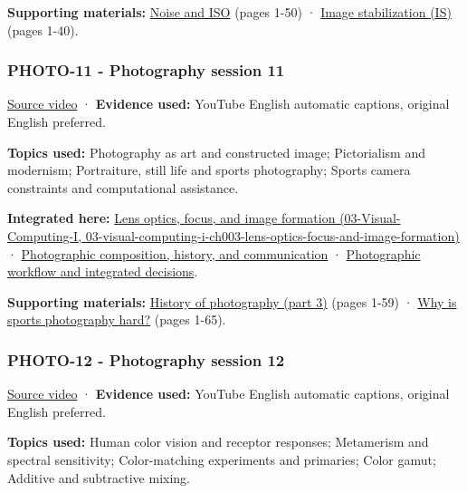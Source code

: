 \textbf{Supporting materials:} \href{https://drive.google.com/open?id=0B6w2XfPHEcZYS2xETmR4SVlIczg}{Noise and ISO} (pages 1-50) · \href{https://drive.google.com/open?id=0B6w2XfPHEcZYcFpESFU4dEM3QkE}{Image stabilization (IS)} (pages 1-40).

\subsubsection{PHOTO-11 - Photography session 11}\label{04-visual-computing-ii-ch036-photo-11---photography-session-11}

\href{https://www.youtube.com/watch?v=AaJz5RMtO4c}{Source video} · \textbf{Evidence used:} YouTube English automatic captions, original English preferred.

\textbf{Topics used:} Photography as art and constructed image; Pictorialism and modernism; Portraiture, still life and sports photography; Sports camera constraints and computational assistance.

\textbf{Integrated here:} \href{../03-Visual-Computing-I/main.pdf\#nameddest=03-visual-computing-i-ch003-lens-optics-focus-and-image-formation}{Lens optics, focus, and image formation (03-Visual-Computing-I, 03-visual-computing-i-ch003-lens-optics-focus-and-image-formation)} · \hyperref[04-visual-computing-ii-ch034-photographic-composition-history-and-communication]{Photographic composition, history, and communication} · \hyperref[04-visual-computing-ii-ch034-photographic-workflow-and-integrated-decisions]{Photographic workflow and integrated decisions}.

\textbf{Supporting materials:} \href{https://drive.google.com/open?id=0B6w2XfPHEcZYU1hzN1BtalBqQ1U}{History of photography (part 3)} (pages 1-59) · \href{https://drive.google.com/open?id=0B6w2XfPHEcZYc1BpLTNjZGUzbk0}{Why is sports photography hard?} (pages 1-65).

\subsubsection{PHOTO-12 - Photography session 12}\label{04-visual-computing-ii-ch036-photo-12---photography-session-12}

\href{https://www.youtube.com/watch?v=gRT0mtabjI4}{Source video} · \textbf{Evidence used:} YouTube English automatic captions, original English preferred.

\textbf{Topics used:} Human color vision and receptor responses; Metamerism and spectral sensitivity; Color-matching experiments and primaries; Color gamut; Additive and subtractive mixing.

